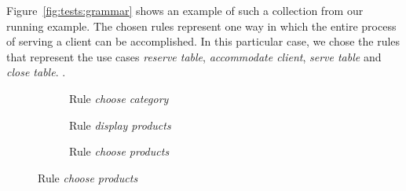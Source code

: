 \begin{example} Figure~\ref{fig:tests:grammar} shows an example of such a collection from our running example. The chosen rules represent one way in which the entire process of serving a client can be accomplished. In this particular case, we chose the rules that represent the use cases \emph{reserve table}, \emph{accommodate client}, \emph{serve table} and \emph{close table}. . 

\begin{figure}[!ht]
  \centering
  \begin{subfigure}[t]{.5\textwidth}
    \centerline{}
    \caption{Rule \emph{choose category}}
  \end{subfigure}
  \begin{subfigure}[t]{.5\textwidth}
    \centerline{}
    \caption{Rule \emph{display products}}
  \end{subfigure}
  \begin{subfigure}[t]{.5\textwidth}
    \centerline{}
    \caption{Rule \emph{choose products}}
  \end{subfigure}

\end{figure}
\end{example}
